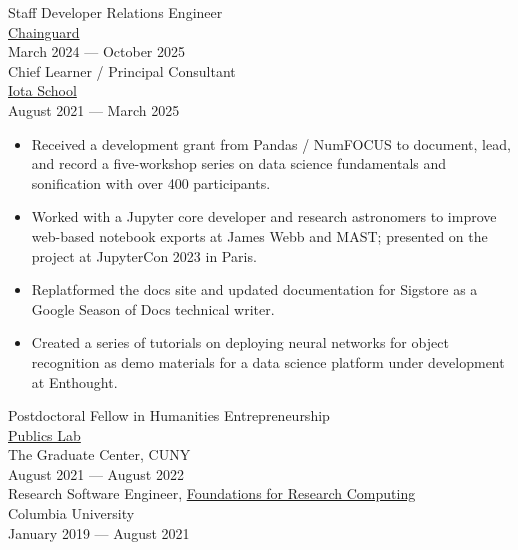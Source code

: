 \documentclass[11pt]{article}
\begin{document}
Staff Developer Relations Engineer\\[0pt]
\href{https://www.chainguard.dev/}{Chainguard}\\[0pt]
March 2024 — October 2025\\[0pt]

Chief Learner / Principal Consultant\\[0pt]
\href{https://iotaschool.com/}{Iota School}\\[0pt]
August 2021 — March 2025\\[0pt]

\begin{itemize}
\item Received a development grant from Pandas / NumFOCUS to document, lead, and record a five-workshop series on data science fundamentals and sonification with over 400 participants.\\[0pt]
\item Worked with a Jupyter core developer and research astronomers to improve web-based notebook exports at James Webb and MAST; presented on the project at JupyterCon 2023 in Paris.\\[0pt]
\item Replatformed the docs site and updated documentation for Sigstore as a Google Season of Docs technical writer.\\[0pt]
\item Created a series of tutorials on deploying neural networks for object recognition as demo materials for a data science platform under development at Enthought.\\[0pt]
\end{itemize}

Postdoctoral Fellow in Humanities Entrepreneurship\\[0pt]
\href{https://publicslab.gc.cuny.edu/}{Publics Lab}\\[0pt]
The Graduate Center, CUNY\\[0pt]
August 2021 — August 2022\\[0pt]

Research Software Engineer, \href{https://rcfoundations.research.columbia.edu/}{Foundations for Research Computing}\\[0pt]
Columbia University\\[0pt]
January 2019 — August 2021\\[0pt]
\end{document}
